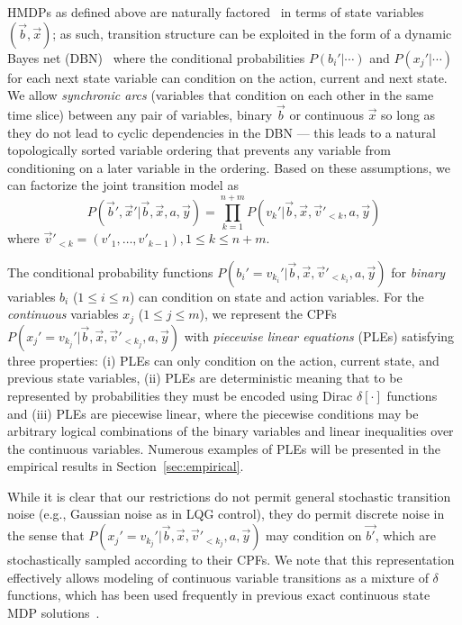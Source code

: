 HMDPs as defined above are naturally factored~\cite{boutilier99dt} in
terms of state variables $(\vec{b},\vec{x})$; as such, transition
structure can be exploited in the form of a dynamic Bayes net
(DBN)~\cite{dbn} where the conditional probabilities $P(b_i'|\cdots)$
and $P(x_j'|\cdots)$ for each next state variable can condition on the
action, current and next state.  We allow
\emph{synchronic arcs} (variables that condition on each
other in the same time slice) between any pair of variables, binary
$\vec{b}$ or continuous $\vec{x}$ so long as they do not lead
to cyclic dependencies in the DBN --- this leads to a natural topologically
sorted variable ordering that prevents any variable from conditioning on
a later variable in the ordering.  Based on these assumptions, we can factorize
the joint transition model as 
{\footnotesize
\begin{equation}
P(\vec{b}',\vec{x}'|\vec{b},\vec{x},a,\vec{y}) = 
\prod_{k=1}^{n+m} P(v_k'| \vec{b},\vec{x}, \vec{v}'_{<k}, a,\vec{y}) \nonumber %
\end{equation}}
where $\vec{v}'_{<k} = ( v'_1,\ldots, v'_{k-1}), 1\leq k \leq n+m$.

The conditional probability functions
$P(b_i'=v_{k_i}'|\vec{b},\vec{x},\vec{v}'_{<{k_i}},a,\vec{y})$
for \emph{binary} variables $b_i$ ($1 \leq i \leq n$) can condition on
state and action variables.
For the \emph{continuous} variables $x_j$ ($1 \leq j \leq m$), we
represent the CPFs
$P(x_j'=v_{k_j}'|\vec{b},\vec{x},\vec{v}'_{<{k_j}},a,\vec{y})$
with \emph{piecewise linear equations} (PLEs) satisfying three
properties: (i) PLEs can only condition on the action, current state,
and previous state variables, (ii) PLEs are deterministic meaning that
to be represented by probabilities they must be encoded using Dirac
$\delta[\cdot]$ functions and (iii) PLEs are piecewise linear, where
the piecewise conditions may be arbitrary logical combinations of the
binary variables and linear inequalities over the continuous
variables. Numerous examples of PLEs will be presented in the empirical
results in Section~\ref{sec:empirical}.

While it is clear that our restrictions do not permit general
stochastic transition noise (e.g., Gaussian noise as in LQG control),
they do permit discrete noise in the sense that
$P(x_j'=v_{k_j}'|\vec{b},\vec{x},\vec{v}'_{<{k_j}},a,\vec{y})$ may
condition on $\vec{b'}$, which are stochastically sampled according to
their CPFs.  We note that this representation effectively allows
modeling of continuous variable transitions as a mixture of $\delta$
functions, which has been used frequently in previous exact continuous
state MDP solutions~\cite{feng04,hao09}.

